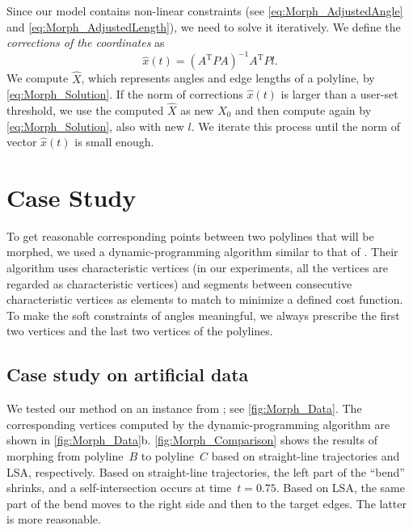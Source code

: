 Since our model contains non-linear constraints
(see \eqs\ref{eq:Morph_AdjustedAngle}
and \ref{eq:Morph_AdjustedLength}), 
we need to solve it iteratively.
We define the \emph{corrections of the coordinates} as
\begin{equation}
\label{eq:Morph_CoordinatesCorrections}
\hat{x}(t)= (A^\mathrm{T}PA)^{-1}A^\mathrm{T}Pl.
\end{equation}
We compute $\hat{X}$,
which represents angles and edge lengths of a polyline,
by \eq\ref{eq:Morph_Solution}.
If the norm of corrections $\hat{x}(t)$ 
is larger than a user-set threshold,
we use the computed $\hat{X}$ as new $X_0$ 
and then compute again by \eq\ref{eq:Morph_Solution}, 
also with new $l$.
We iterate this process until 
the norm of vector $\hat{x}(t)$ is small enough.


\section{Case Study}
\label{case-study}

To get reasonable corresponding points between two polylines 
that will be morphed, 
we used a dynamic-programming algorithm 
similar to that of \textcite{Noellenburg2008}. 
Their algorithm uses characteristic vertices 
(in our experiments, 
all the vertices are regarded as characteristic vertices) 
and segments between consecutive characteristic vertices 
as elements to match to minimize a defined cost function. 
To make the soft constraints of angles meaningful, 
we always prescribe the first two vertices 
and the last two vertices of the polylines.

\subsection{Case study on artificial data}
\label{case-study-on-artificial-data}

We tested our method on an instance from \textcite{Bereg2005};
see \fig\ref{fig:Morph_Data}.
The corresponding vertices computed 
by the dynamic-programming algorithm 
are shown in \fig\ref{fig:Morph_Data}b.
\fig\ref{fig:Morph_Comparison} 
shows the results of morphing 
from polyline~$B$ to polyline~$C$ based on
straight-line trajectories and LSA, respectively. 
Based on straight-line trajectories, 
the left part of the ``bend'' shrinks, 
and a self-intersection occurs at time~$t = 0.75$. 
Based on LSA, the same part of the bend moves
to the right side and then to the target edges. 
The latter is more reasonable.

